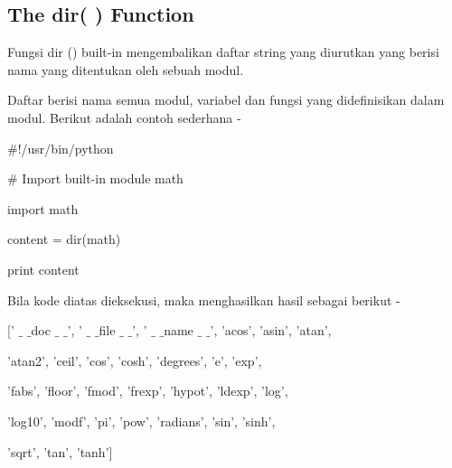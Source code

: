 \documentclass[a4paper,12pt]{report}
\begin{document}
\subsection*{The dir( ) Function}
 \par
\begin{adjustwidth}{0.03in}{0.03in}
Fungsi dir () built-in mengembalikan daftar string yang diurutkan yang berisi nama yang ditentukan oleh sebuah modul.\end{adjustwidth}
 \par
\begin{adjustwidth}{0.03in}{0.03in}
Daftar berisi nama semua modul, variabel dan fungsi yang didefinisikan dalam modul. Berikut adalah contoh sederhana -\end{adjustwidth}
 \par
\noindent 
 \hspace*{0.5in}  $  \#  $!/usr/bin/python \par
\vspace{12pt}
\noindent 
 \hspace*{0.5in}  $  \#  $ Import built-in module math \par
\noindent 
 \hspace*{0.5in} import math \par
\vspace{12pt}
\noindent 
 \hspace*{0.5in} content = dir(math) \par
\vspace{12pt}
\noindent 
 \hspace*{0.5in} print content \par
\begin{adjustwidth}{0.03in}{0.03in}
Bila kode diatas dieksekusi, maka menghasilkan hasil sebagai berikut -\end{adjustwidth}
 \par
\noindent 
 \hspace*{0.5in} [' $  \_  $ $  \_  $doc $  \_  $ $  \_  $', ' $  \_  $ $  \_  $file $  \_  $ $  \_  $', ' $  \_  $ $  \_  $name $  \_  $ $  \_  $', 'acos', 'asin', 'atan',  \par
\noindent 
 \hspace*{0.5in} 'atan2', 'ceil', 'cos', 'cosh', 'degrees', 'e', 'exp',  \par
\noindent 
 \hspace*{0.5in} 'fabs', 'floor', 'fmod', 'frexp', 'hypot', 'ldexp', 'log', \par
\noindent 
 \hspace*{0.5in} 'log10', 'modf', 'pi', 'pow', 'radians', 'sin', 'sinh',  \par
\noindent 
 \hspace*{0.5in} 'sqrt', 'tan', 'tanh'] \par
\end{document}

